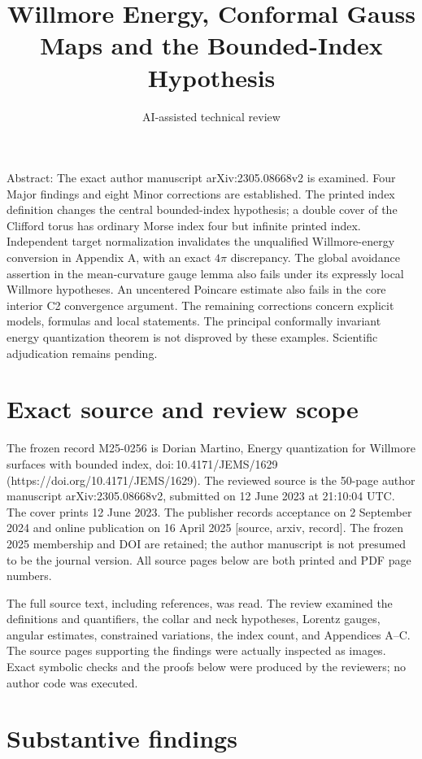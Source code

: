\documentclass[10pt]{article}
\title{Willmore Energy, Conformal Gauss Maps
and the Bounded-Index Hypothesis}
\author{AI-assisted technical review}
\date{}
\begin{document}
\maketitle
Abstract: The exact author manuscript arXiv:2305.08668v2 is examined. Four Major findings and eight Minor corrections are established. The printed index definition changes the central bounded-index hypothesis; a double cover of the Clifford torus has ordinary Morse index four but infinite printed index. Independent target normalization invalidates the unqualified Willmore-energy conversion in Appendix A, with an exact \(4\pi\) discrepancy. The global avoidance assertion in the mean-curvature gauge lemma also fails under its expressly local Willmore hypotheses. An uncentered Poincare estimate also fails in the core interior C2 convergence argument. The remaining corrections concern explicit models, formulas and local statements. The principal conformally invariant energy quantization theorem is not disproved by these examples. Scientific adjudication remains pending.\par
\section*{Exact source and review scope}
The frozen record M25-0256 is Dorian Martino, Energy quantization for Willmore surfaces with bounded index, doi: 10.4171/JEMS/1629 (https://doi.org/10.4171/JEMS/1629). The reviewed source is the 50-page author manuscript arXiv:2305.08668v2, submitted on 12 June 2023 at 21:10:04 UTC. The cover prints 12 June 2023. The publisher records acceptance on 2 September 2024 and online publication on 16 April 2025 [source, arxiv, record]. The frozen 2025 membership and DOI are retained; the author manuscript is not presumed to be the journal version. All source pages below are both printed and PDF page numbers.\par
The full source text, including references, was read. The review examined the definitions and quantifiers, the collar and neck hypotheses, Lorentz gauges, angular estimates, constrained variations, the index count, and Appendices A–C. The source pages supporting the findings were actually inspected as images. Exact symbolic checks and the proofs below were produced by the reviewers; no author code was executed.\par
\section*{Substantive findings}
\end{document}
